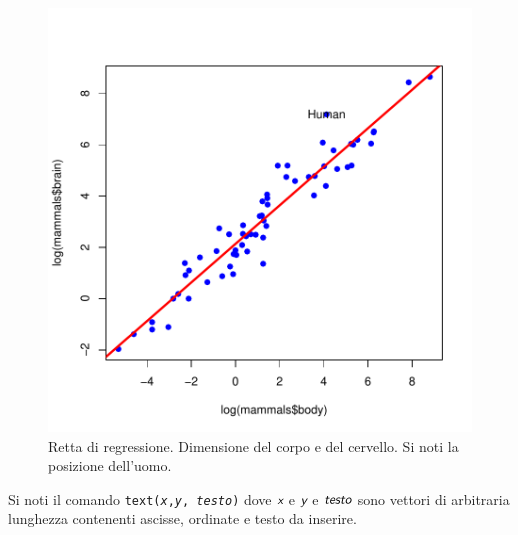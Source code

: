 \documentclass[onecolumn,12pt]{book}
\newcommand{\varia}[1]{\textsl{\textsf{#1}}}
\begin{document}
\begin{figure}[htbp]
\begin{center}
\includegraphics{RbookParte2-143}
\caption{ Retta di regressione. Dimensione del corpo e del cervello. Si noti la posizione dell'uomo.}
\label{duerette}
\end{center}
\end{figure}
Si noti il comando \texttt{text(\varia{x},\varia{y}, \varia{testo})}
dove    $\varia{x}$ e $\varia{y}$  e $\varia{testo}$ sono vettori di arbitraria lunghezza contenenti ascisse, ordinate e testo da inserire.
\end{document}
